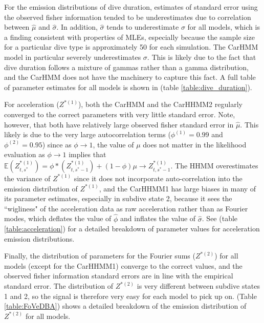 For the emission distributions of dive duration, estimates of standard error using the observed fisher information tended to be underestimates due to correlation between $\hat \mu$ and $\hat \sigma$. In addition, $\hat \sigma$ tends to underestimate $\sigma$ for all models, which is a finding consistent with properties of MLEs, especially because the sample size for a particular dive type is approximately 50 for each simulation. The CarHMM model in particular severely underestimates $\sigma$. This is likely due to the fact that dive duration follows a mixture of gammas rather than a gamma distribution, and the CarHMM does not have the machinery to capture this fact. A full table of parameter estimates for all models is shown in (table \ref{table:dive_duration}).


For acceleration ($Z^{*(1)}$), both the CarHMM and the CarHHMM2 regularly converged to the correct parameters with very little standard error. Note, however, that both have relatively large observed fisher standard error in $\hat \mu$. This likely is due to the very large autocorrelation terms ($\phi^{(1)} = 0.99$ and $\phi^{(2)} = 0.95$) since as $\phi \to 1$, the value of $\mu$ does not matter in the likelihood evaluation as $\phi \to 1$ implies that $\mathbb{E}(Z^{*(1)}_{t,s^*}) = \phi*(Z^{*(1)}_{t,s^*-1}) + (1-\phi)\mu \to Z^{*(1)}_{t,s^*-1}$. The HHMM overestimates the variance of $Z^{*(1)}$ since it does not incorporate auto-correlation into the emission distribution of $Z^{*(1)}$, and the CarHHMM1 has large biases in many of its parameter estimates, especially in subdive state 2, because it sees the ``wigliness" of the acceleration data as raw acceleration rather than as Fourier modes, which deflates the value of $\hat \phi$ and inflates the value of $\hat \sigma$. See (table \ref{table:acceleration}) for a detailed breakdown of parameter values for acceleration emission distributions.


Finally, the distribution of parameters for the Fourier sums ($Z^{*(2)}$) for all models (except for the CarHHMM1) converge to the correct values, and the observed fisher information standard errors are in line with the empirical standard error. The distribution of $Z^{*(2)}$ is very different between subdive states 1 and 2, so the signal is therefore very easy for each model to pick up on. (Table \ref{table:FoVeDBA}) shows a detailed breakdown of the emission distribution of $Z^{*(2)}$ for all models.

